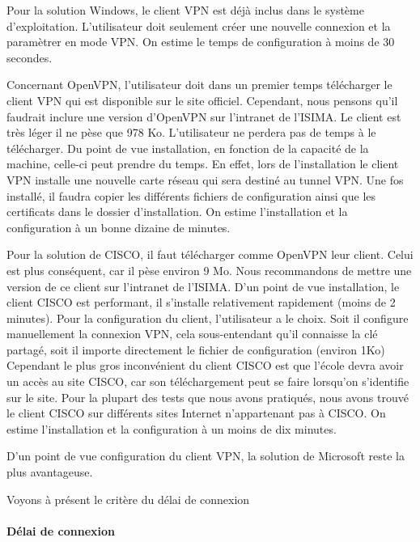 Pour la solution Windows, le client VPN est déjà inclus dans le système d'exploitation. L'utilisateur doit seulement créer une nouvelle connexion et la paramètrer en mode VPN. On estime le temps de configuration à moins de 30 secondes.
~


Concernant OpenVPN, l'utilisateur doit dans un premier temps télécharger le client VPN qui est disponible sur le site officiel. Cependant, nous pensons qu'il faudrait inclure une version d'OpenVPN sur l'intranet de l'ISIMA. Le client est très léger il ne pèse que 978 Ko. L'utilisateur ne perdera pas de temps à le télécharger. Du point de vue installation, en fonction de la capacité de la machine, celle-ci peut prendre du temps. En effet, lors de l'installation le client VPN installe une nouvelle carte réseau qui sera destiné au tunnel VPN. Une fos installé, il faudra copier les différents fichiers de configuration ainsi que les certificats dans le dossier d'installation.
On estime l'installation et la configuration à un bonne dizaine de minutes.
~


Pour la solution de CISCO, il faut télécharger comme OpenVPN leur client. Celui est plus conséquent, car il pèse environ 9 Mo. Nous recommandons de mettre une version de ce client sur l'intranet de l'ISIMA. D'un point de vue installation, le client CISCO est performant, il s'installe relativement rapidement (moins de 2 minutes). Pour la configuration du client, l'utilisateur a le choix. Soit il configure manuellement la connexion VPN, cela sous-entendant qu'il connaisse la clé partagé, soit il importe directement le fichier de configuration (environ 1Ko)
Cependant le plus gros inconvénient du client CISCO est que l'école devra avoir un accès au site CISCO, car son téléchargement peut se faire lorsqu'on s'identifie sur le site. Pour la plupart des tests que nous avons pratiqués, nous avons trouvé le client CISCO sur différents sites Internet n'appartenant pas à CISCO.
On estime l'installation et la configuration à un moins de dix minutes.

D'un point de vue configuration du client VPN, la solution de Microsoft reste la plus avantageuse. 

Voyons à présent le critère du délai de connexion  

\paragraph{Délai de connexion}
~\


